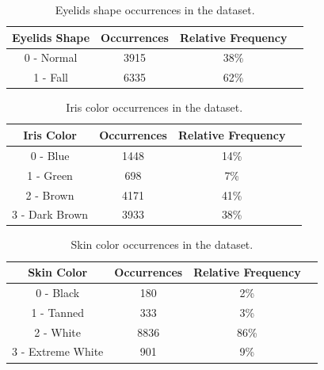 \documentclass[12pt,a4paper,oneside]{memoir}
\begin{document}
    
    \begin{table}
    \begin{center}
    \begin{tabular}{ |c|c|c|c| } 
    \hline
    Eyelids Shape & Occurrences & Relative Frequency\\
    \hline
        0 - Normal &  3915 & 38\% \\ 
        1 - Fall & 6335 & 62\% \\ 

    \hline
    \end{tabular}
    \caption{Eyelids shape occurrences in the dataset.}
    \label{tab:elidsshape}
    \end{center}
    \end{table}
    
    
     \begin{table}
    \begin{center}
    \begin{tabular}{ |c|c|c|c| } 
    \hline
    Iris Color & Occurrences & Relative Frequency\\
    \hline
        0 - Blue &  1448 & 14\% \\ 
        1 - Green & 698 & 7\% \\ 
        2 - Brown & 4171 & 41\% \\ 
        3 - Dark Brown & 3933 & 38\%\\ 


    \hline
    \end{tabular}
    \caption{Iris color occurrences in the dataset.}
    \label{tab:iriscolor}
    \end{center}
    \end{table}
    
    
    
      \begin{table}
    \begin{center}
    \begin{tabular}{ |c|c|c|c| } 
    \hline
    Skin Color & Occurrences & Relative Frequency\\
    \hline
        0 - Black &  180 & 2\% \\ 
        1 - Tanned & 333 & 3\% \\ 
        2 - White & 8836 & 86\% \\ 
        3 - Extreme White & 901 & 9\% \\ 


    \hline
    \end{tabular}
    \caption{Skin color occurrences in the dataset.}
    \label{tab:skincolor}
    \end{center}
    \end{table}
    
\end{document}
